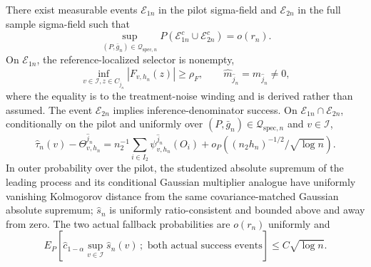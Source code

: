 There exist measurable events \(\mathcal E_{1n}\) in the pilot sigma-field and \(\mathcal E_{2n}\) in the full sample sigma-field such that
\[
 \sup_{(P,\bar g_n)\in\mathcal Q_{\mathrm{spec},n}}
 P(\mathcal E_{1n}^c\cup\mathcal E_{2n}^c)=o(r_n).
\]
On \(\mathcal E_{1n}\), the reference-localized selector is nonempty,
\[
 \inf_{v\in\mathcal I,z\in C_{\widehat j_n}}|F_{v,h_n}(z)|\ge\rho_F,
 \qquad
 \widehat m_{\widehat j_n}=m_{\widehat j_n}\ne0,
\]
where the equality is to the treatment-noise winding and is derived rather than assumed. The event \(\mathcal E_{2n}\) implies inference-denominator success. On \(\mathcal E_{1n}\cap\mathcal E_{2n}\), conditionally on the pilot and uniformly over \((P,\bar g_n)\in\mathcal Q_{\mathrm{spec},n}\) and \(v\in\mathcal I\),
\[
 \widehat\tau_n(v)-\Theta^{\widehat j_n}_{v,h_n}
 =n_2^{-1}\sum_{i\in I_2}\psi^{\widehat j_n}_{v,h_n}(O_i)
 +o_P\!\left((n_2h_n)^{-1/2}/\sqrt{\log n}\right).
\]
In outer probability over the pilot, the studentized absolute supremum of the leading process and its conditional Gaussian multiplier analogue have uniformly vanishing Kolmogorov distance from the same covariance-matched Gaussian absolute supremum; \(\widehat s_n\) is uniformly ratio-consistent and bounded above and away from zero. The two actual fallback probabilities are \(o(r_n)\) uniformly and
\[
 E_P\!\left[\widehat c_{1-\alpha}\sup_{v\in\mathcal I}\widehat s_n(v)\,;\text{ both actual success events}\right]\le C\sqrt{\log n}.
\]